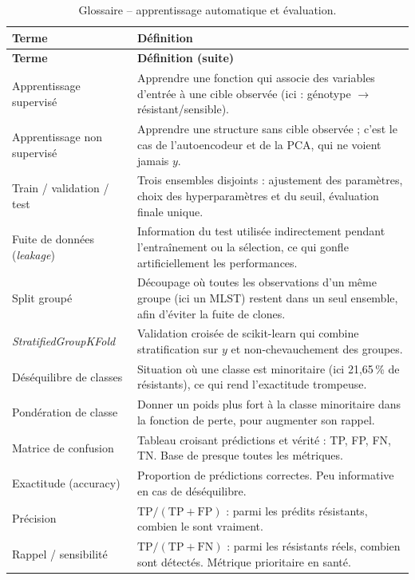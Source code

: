 \documentclass[11pt,a4paper]{article}
\begin{document}
\begin{longtable}{@{}>{\raggedright\arraybackslash}p{3.5cm}>{\raggedright\arraybackslash}p{12cm}@{}}
\caption{Glossaire -- apprentissage automatique et évaluation.}
\label{tab:glossaire-ml}\\
\toprule
\textbf{Terme} & \textbf{Définition} \\
\midrule
\endfirsthead
\toprule
\textbf{Terme} & \textbf{Définition (suite)} \\
\midrule
\endhead
\bottomrule
\endfoot
Apprentissage supervisé & Apprendre une fonction qui associe des variables d'entrée à une cible observée (ici : génotype $\rightarrow$ résistant/sensible). \\
Apprentissage non supervisé & Apprendre une structure sans cible observée ; c'est le cas de l'autoencodeur et de la PCA, qui ne voient jamais $y$. \\
Train / validation / test & Trois ensembles disjoints : ajustement des paramètres, choix des hyperparamètres et du seuil, évaluation finale unique. \\
Fuite de données (\emph{leakage}) & Information du test utilisée indirectement pendant l'entraînement ou la sélection, ce qui gonfle artificiellement les performances. \\
Split groupé & Découpage où toutes les observations d'un même groupe (ici un MLST) restent dans un seul ensemble, afin d'éviter la fuite de clones. \\
\emph{StratifiedGroupKFold} & Validation croisée de scikit-learn qui combine stratification sur $y$ et non-chevauchement des groupes. \\
Déséquilibre de classes & Situation où une classe est minoritaire (ici 21,65\,\% de résistants), ce qui rend l'exactitude trompeuse. \\
Pondération de classe & Donner un poids plus fort à la classe minoritaire dans la fonction de perte, pour augmenter son rappel. \\
Matrice de confusion & Tableau croisant prédictions et vérité : TP, FP, FN, TN. Base de presque toutes les métriques. \\
Exactitude (accuracy) & Proportion de prédictions correctes. Peu informative en cas de déséquilibre. \\
Précision & $\mathrm{TP}/(\mathrm{TP}+\mathrm{FP})$ : parmi les prédits résistants, combien le sont vraiment. \\
Rappel / sensibilité & $\mathrm{TP}/(\mathrm{TP}+\mathrm{FN})$ : parmi les résistants réels, combien sont détectés. Métrique prioritaire en santé. \\

\end{longtable}
\end{document}
